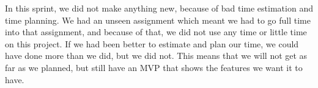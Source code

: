 In this sprint, we did not make anything new, because of bad time estimation and time planning.
We had an unseen assignment which meant we had to go full time into that assignment, and because of that, we did not use any time or little time on this project.
If we had been better to estimate and plan our time, we could have done more than we did, but we did not.
This means that we will not get as far as we planned, but still have an MVP that shows the features we want it to have.